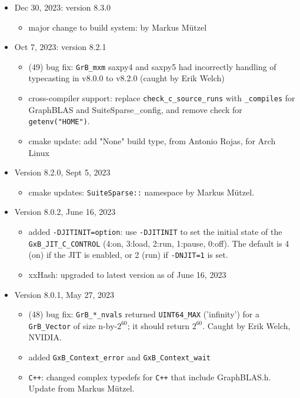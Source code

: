 \documentclass[12pt]{article}
\begin{document}
\begin{itemize}

\item Dec 30, 2023: version 8.3.0

    \begin{itemize}
    \item major change to build system: by Markus M\"{u}tzel
    \end{itemize}

\item Oct 7, 2023: version 8.2.1

    \begin{itemize}
    \item (49) bug fix: \verb'GrB_mxm' saxpy4 and saxpy5 had incorrectly handling of
        typecasting in v8.0.0 to v8.2.0 (caught by Erik Welch)
    \item cross-compiler support: replace \verb'check_c_source_runs' with \verb'_compiles'
        for GraphBLAS and SuiteSparse\_config, and remove check for
        \verb'getenv("HOME")'.
    \item cmake update: add "None" build type, from Antonio Rojas, for Arch Linux
    \end{itemize}

\item Version 8.2.0, Sept 5, 2023

    \begin{itemize}
    \item cmake updates: \verb'SuiteSparse::' namespace by Markus M\"{u}tzel.
    \end{itemize}

\item Version 8.0.2, June 16, 2023

    \begin{itemize}
    \item added \verb'-DJITINIT=option':  use \verb'-DJITINIT' to set the
        initial state of the \verb'GxB_JIT_C_CONTROL' (4:on, 3:load, 2:run,
        1:pause, 0:off).  The default is 4 (on) if the JIT is enabled, or 2
        (run) if \verb'-DNJIT=1' is set.
    \item xxHash: upgraded to latest version as of June 16, 2023
    \end{itemize}

\item Version 8.0.1, May 27, 2023

    \begin{itemize}
    \item (48) bug fix: \verb'GrB_*_nvals'
        returned \verb'UINT64_MAX' ('infinity') for a
        \verb'GrB_Vector' of size n-by-$2^{60}$; it should return $2^{60}$.
        Caught by Erik Welch, NVIDIA.
    \item added \verb'GxB_Context_error' and \verb'GxB_Context_wait'
    \item \verb'C++': changed complex typedefs for \verb'C++' that
        include GraphBLAS.h.  Update from Markus M\"{u}tzel.
    \end{itemize}


\end{itemize}
\end{document}
